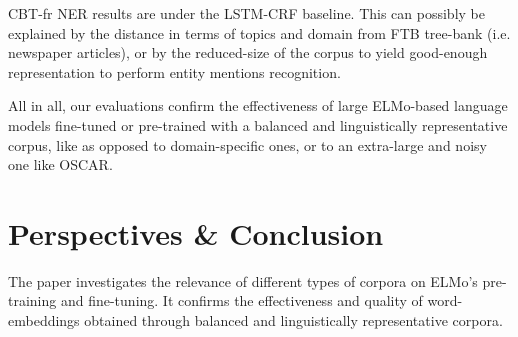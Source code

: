 
CBT-fr NER results are under the LSTM-CRF baseline. This can possibly be explained by the distance in terms of topics and domain from FTB tree-bank (i.e. newspaper articles), or by the reduced-size of the corpus to yield good-enough representation to perform entity mentions recognition.

All in all, our evaluations confirm the effectiveness of large ELMo-based language models fine-tuned or pre-trained with a balanced and linguistically representative corpus, like \Cabernet as opposed to domain-specific ones, or to an extra-large and noisy one like OSCAR.







\section{Perspectives \& Conclusion} \label{sec:Concl}


The paper investigates the relevance of different types of corpora on ELMo's pre-training and fine-tuning. It confirms the effectiveness and quality of word-embeddings obtained through balanced and linguistically representative corpora. %

